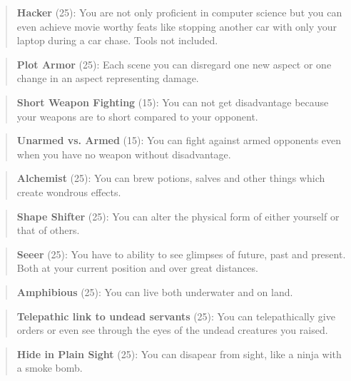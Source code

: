 \documentclass[11pt]{article}
\begin{document}
{\begin{quote}
\textbf{Hacker} (25): You are not only proficient in computer science but you can even achieve movie worthy feats like stopping another car with only your laptop during a car chase. Tools not included.
\end{quote}

\begin{quote}
\textbf{Plot Armor} (25): Each scene you can disregard one new aspect or one change in an aspect representing damage. 
\end{quote}

\begin{quote}
\textbf{Short Weapon Fighting} (15): You can not get disadvantage because your weapons are to short compared to your opponent.
\end{quote}

\begin{quote}
\textbf{Unarmed vs. Armed} (15): You can fight against armed opponents even when you have no weapon without disadvantage.
\end{quote}

\begin{quote}
\textbf{Alchemist} (25): You can brew potions, salves and other things which create wondrous effects.
\end{quote}

\begin{quote}
\textbf{Shape Shifter} (25): You can alter the physical form of either yourself or that of others.
\end{quote}

\begin{quote}
\textbf{Seeer} (25): You have to ability to see glimpses of future, past and present. Both at your current position and over great distances. 
\end{quote}

\begin{quote}
\textbf{Amphibious} (25): You can live both underwater and on land.
\end{quote}

\begin{quote}
\textbf{Telepathic link to undead servants} (25): You can telepathically give orders or even see through the eyes of the undead creatures you raised. 
\end{quote}

\begin{quote}
\textbf{Hide in Plain Sight} (25): You can disapear from sight, like a ninja with a smoke bomb.
\end{quote}
}
\end{document}
